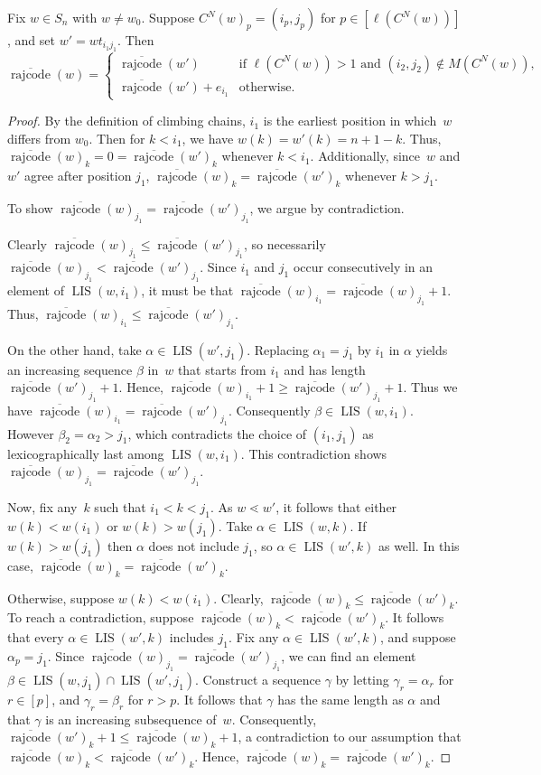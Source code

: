 \documentclass[ALCO]{cedram}
\DeclareMathOperator{\LIS}{\mathrm{LIS}}
\DeclareMathOperator{\rr}{\mathrm{rajcode}}
\newcommand{\orr}{\overline{\rr}}
\newcommand{\CN}{C^N}
\begin{document}
\begin{theorem}
	\label{thm:drecursion}
	Fix $w\in S_n$ with $w\neq w_0$. 
	Suppose $\CN(w)_p=(i_p,j_p)$ for $p\in [\ell(\CN(w))]$, and set $w'=wt_{i_1j_1}$. Then
	\[
	\orr(w) = 
	\begin{cases}
		\orr(w') &\mbox{if } \ell(\CN(w))>1 \mbox{ and }(i_2,j_2)\notin M(\CN(w)),\\
		\orr(w')+e_{i_1}&\mbox{otherwise}.
	\end{cases} 
	\]
\end{theorem}
\begin{proof}
	By the definition of climbing chains, $i_1$ is the earliest position in which~$w$ differs from $w_0$. Then for $k<i_1$, we have $w(k) = w'(k) = n+1-k$. Thus, $\orr(w)_k=0=\orr(w')_k$ whenever $k<i_1$. Additionally, since~$w$ and $w'$ agree after position $j_1$, $\orr(w)_k=\orr(w')_k$ whenever $k> j_1$.
	
	To show $\orr(w)_{j_1} = \orr(w')_{j_1}$, we argue by contradiction. 
	
	Clearly $\orr(w)_{j_1}\leq \orr(w')_{j_1}$, so necessarily $\orr(w)_{j_1}<\orr(w')_{j_1}$. Since $i_1$ and $j_1$ occur consecutively in an element of $\LIS(w,i_1)$, it must be that $\orr(w)_{i_1}=\orr(w)_{j_1}+1$. Thus, $\orr(w)_{i_1}\leq \orr(w')_{j_1}$.
	
	On the other hand, take $\alpha\in\LIS(w',j_1)$. Replacing $\alpha_1=j_1$ by $i_1$ in $\alpha$ yields an increasing sequence $\beta$ in~$w$ that starts from $i_1$ and has length $\orr(w')_{j_1}+1$. Hence, $\orr(w)_{i_1}+1\geq \orr(w')_{j_1}+1$. Thus we have $\orr(w)_{i_1}=\orr(w')_{j_1}$. Consequently $\beta\in \LIS(w,i_1)$. However $\beta_2=\alpha_2>j_1$, which contradicts the choice of $(i_1,j_1)$ as lexicographically last among $\LIS(w,i_1)$. This contradiction shows $\orr(w)_{j_1}=\orr(w')_{j_1}$.
	
	Now, fix any~$k$ such that $i_1<k<j_1$. As $w\lessdot w'$, it follows that either $w(k)<w(i_1)$ or $w(k)>w(j_1)$. Take $\alpha\in\LIS(w,k)$. If $w(k)>w(j_1)$ then $\alpha$ does not include $j_1$, so $\alpha\in\LIS(w',k)$ as well. In this case, $\orr(w)_k=\orr(w')_k$.
	
	Otherwise, suppose $w(k)<w(i_1)$. Clearly, $\orr(w)_k\leq \orr(w')_k$. To reach a contradiction, suppose $\orr(w)_k<\orr(w')_k$. It follows that every $\alpha\in\LIS(w',k)$ includes $j_1$. Fix any $\alpha\in\LIS(w',k)$, and suppose $\alpha_p=j_1$. Since $\orr(w)_{j_1} = \orr(w')_{j_1}$, we can find an element $\beta\in \LIS(w,j_1)\cap \LIS(w',j_1)$. Construct a sequence $\gamma$ by letting $\gamma_r=\alpha_r$ for $r\in [p]$, and $\gamma_r=\beta_r$ for $r> p$. It follows that $\gamma$ has the same length as $\alpha$ and that $\gamma$ is an increasing subsequence of~$w$. Consequently, $\orr(w')_k+1\leq \orr(w)_k+1$, a contradiction to our assumption that $\orr(w)_k<\orr(w')_k$. Hence, $\orr(w)_k=\orr(w')_k$.
	

\end{proof}
\end{document}
